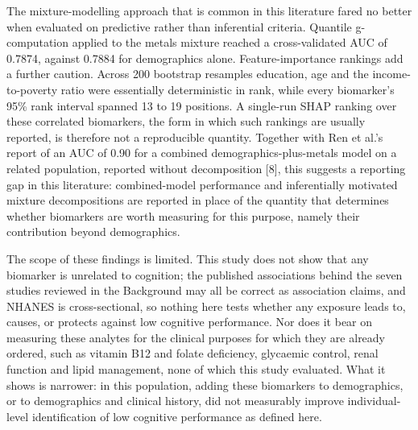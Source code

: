 \documentclass[12pt]{article}
\begin{document}
The mixture-modelling approach that is common in this literature fared no better when evaluated on predictive rather than inferential criteria. Quantile g-computation applied to the metals mixture reached a cross-validated AUC of 0.7874, against 0.7884 for demographics alone. Feature-importance rankings add a further caution. Across 200 bootstrap resamples education, age and the income-to-poverty ratio were essentially deterministic in rank, while every biomarker's 95\% rank interval spanned 13 to 19 positions. A single-run SHAP ranking over these correlated biomarkers, the form in which such rankings are usually reported, is therefore not a reproducible quantity. Together with Ren et al.'s report of an AUC of 0.90 for a combined demographics-plus-metals model on a related population, reported without decomposition [8], this suggests a reporting gap in this literature: combined-model performance and inferentially motivated mixture decompositions are reported in place of the quantity that determines whether biomarkers are worth measuring for this purpose, namely their contribution beyond demographics.

The scope of these findings is limited. This study does not show that any biomarker is unrelated to cognition; the published associations behind the seven studies reviewed in the Background may all be correct as association claims, and NHANES is cross-sectional, so nothing here tests whether any exposure leads to, causes, or protects against low cognitive performance. Nor does it bear on measuring these analytes for the clinical purposes for which they are already ordered, such as vitamin B12 and folate deficiency, glycaemic control, renal function and lipid management, none of which this study evaluated. What it shows is narrower: in this population, adding these biomarkers to demographics, or to demographics and clinical history, did not measurably improve individual-level identification of low cognitive performance as defined here.
\end{document}
